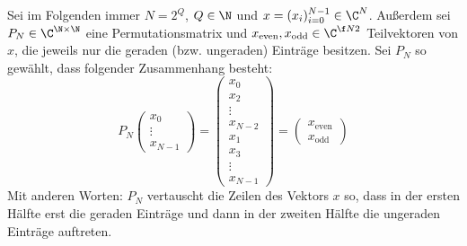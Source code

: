\documentclass[11pt]{scrbook}
\begin{document}
\newcommand{\xeven}{\ensuremath{x_{\text{even}}}}
\newcommand{\xodd}{\ensuremath{x_{\text{odd}}}}
Sei im Folgenden immer $N=2^Q$, $Q\in \N$ und $x=(x_i)_{i=0}^{N-1} \in \C^N$.
Außerdem sei $P_N \in \C^{\N\times \N}$ eine Permutationsmatrix und $\xeven, \xodd \in \C^{\f N2}$ Teilvektoren von $x$, die jeweils nur die geraden (bzw. ungeraden) Einträge besitzen.
Sei $P_N$ so gewählt, dass folgender Zusammenhang besteht:
\[
	P_N \begin{pmatrix}x_0\\ \vdots \\ x_{N-1}\end{pmatrix}
	= \begin{pmatrix} x_0 \\ x_2 \\ \vdots \\ x_{N-2} \\ x_1 \\ x_3 \\\vdots \\ x_{N-1}\end{pmatrix}
	= \begin{pmatrix} \xeven \\ \xodd \end{pmatrix}
\]
Mit anderen Worten: $P_N$ vertauscht die Zeilen des Vektors $x$ so, dass in der ersten Hälfte erst die geraden Einträge und dann in der zweiten Hälfte die ungeraden Einträge auftreten.
\end{document}
